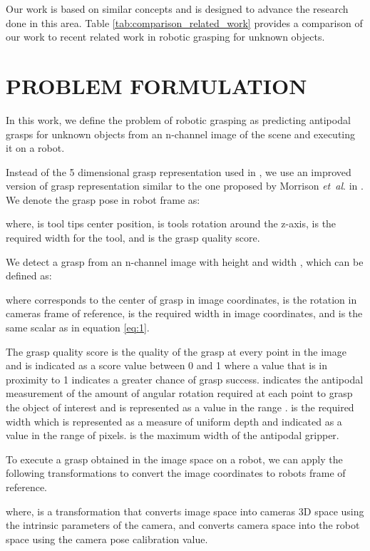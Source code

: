 \documentclass[letterpaper, 10 pt, conference]{ieeeconf}
\newcommand{\etal}{\textit{et~al}. }
\begin{document}
Our work is based on similar concepts and is designed to advance the research done in this area. Table \ref{tab:comparison_related_work} provides a comparison of our work to recent related work in robotic grasping for unknown objects.



\section{PROBLEM FORMULATION}
In this work, we define the problem of robotic grasping as predicting antipodal grasps for unknown objects from an n-channel image of the scene and executing it on a robot.

Instead of the 5 dimensional grasp representation used in \cite{lenz2015deep, redmon2015real, kumra2017robotic}, we use an improved version of grasp representation similar to the one proposed by Morrison \etal in \cite{morrison2019learning}. We denote the grasp pose in robot frame as:

where,  is tool tip\textquotesingle s center position,  is tools rotation around the z-axis,  is the required width for the tool, and  is the grasp quality score.

We detect a grasp from an n-channel image  with height  and width , which can be defined as:

where  corresponds to the center of grasp in image coordinates,  is the rotation in camera\textquotesingle s frame of reference,  is the required width in image coordinates, and  is the same scalar as in equation \eqref{eq:1}.

The grasp quality score  is the quality of the grasp at every point in the image and is indicated as a score value between 0 and 1 where a value that is in proximity to 1 indicates a greater chance of grasp success.  indicates the antipodal measurement of the amount of angular rotation required at each point to grasp the object of interest and is represented as a value in the range .  is the required width which is represented as a measure of uniform depth and indicated as a value in the range of  pixels.  is the maximum width of the antipodal gripper.

To execute a grasp obtained in the image space on a robot, we can apply the following transformations to convert the image coordinates to robot\textquotesingle s frame of reference.

where,  is a transformation that converts image space into camera\textquotesingle s 3D space using the intrinsic parameters of the camera, and  converts camera space into the robot space using the camera pose calibration value. 
\end{document}
